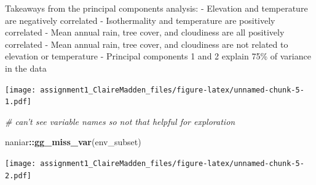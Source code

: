 \documentclass[]{article}
\newenvironment{Shaded}{\begin{snugshade}}{\end{snugshade}}
\newcommand{\KeywordTok}[1]{\textcolor[rgb]{0.13,0.29,0.53}{\textbf{#1}}}
\newcommand{\DataTypeTok}[1]{\textcolor[rgb]{0.13,0.29,0.53}{#1}}
\newcommand{\StringTok}[1]{\textcolor[rgb]{0.31,0.60,0.02}{#1}}
\newcommand{\CommentTok}[1]{\textcolor[rgb]{0.56,0.35,0.01}{\textit{#1}}}
\newcommand{\OperatorTok}[1]{\textcolor[rgb]{0.81,0.36,0.00}{\textbf{#1}}}
\newcommand{\NormalTok}[1]{#1}
\begin{document}
Takeaways from the principal components analysis: - Elevation and
temperature are negatively correlated - Isothermality and temperature
are positively correlated - Mean annual rain, tree cover, and cloudiness
are all positively correlated - Mean annual rain, tree cover, and
cloudiness are not related to elevation or temperature - Principal
components 1 and 2 explain 75\% of variance in the data

\begin{Shaded}
\end{Shaded}

\begin{Shaded}
\end{Shaded}

\texttt{[image: assignment1\_ClaireMadden\_files/figure-latex/unnamed-chunk-5-1.pdf]}

\begin{Shaded}
\begin{Highlighting}[]
\CommentTok{# can't see variable names so not that helpful for exploration}

\NormalTok{naniar}\OperatorTok{::}\KeywordTok{gg_miss_var}\NormalTok{(env_subset)}
\end{Highlighting}
\end{Shaded}

\texttt{[image: assignment1\_ClaireMadden\_files/figure-latex/unnamed-chunk-5-2.pdf]}
\end{document}
